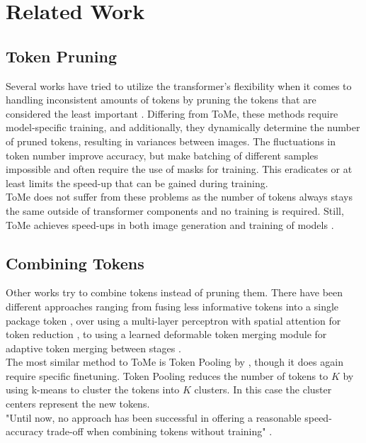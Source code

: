 \section{Related Work} \label{related_work}


\subsection{Token Pruning}
Several works have tried to utilize the transformer's flexibility when it comes to handling inconsistent amounts of tokens by pruning the tokens that are considered the least important \cite{meng2022adavit,yin2022vit}. 
Differing from ToMe, these methods require model-specific training, and additionally, they dynamically determine the number of pruned tokens, resulting in variances between images. The fluctuations in token number improve accuracy, but make batching of different samples impossible and often require the use of masks for training. This eradicates or at least limits the speed-up that can be gained during training.\\
ToMe does not suffer from these problems as the number of tokens always stays the same outside of transformer components and no training is required. Still, ToMe achieves speed-ups in both image generation and training of models \cite{bolya2023tomesd}.



\subsection{Combining Tokens}
Other works try to combine tokens instead of pruning them.
There have been different approaches ranging from fusing less informative tokens into a single package token \cite{kong2021spvit, liang2022not}, over using a multi-layer perceptron with spatial attention for token reduction \cite{ryoo2021tokenlearner}, to using a learned deformable token merging module for adaptive token merging between stages \cite{pan2022less}.\\
The most similar method to ToMe is Token Pooling by \cite{marin2021token}, though it does again require specific finetuning. Token Pooling reduces the number of tokens to \(K\) by using k-means to cluster the tokens into \(K\) clusters. In this case the cluster centers represent the new tokens.\\
"Until now, no approach has been successful in offering a reasonable speed-accuracy trade-off when combining tokens without training" \cite{bolya2023tome}.



